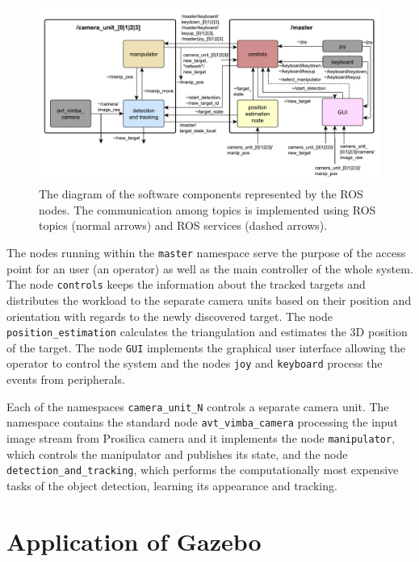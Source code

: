 	\begin{figure}[htb]
		\centering
		\includegraphics[width=14.5cm]{fig/sw_ols.pdf}
		\caption{The diagram of the software components represented by the ROS nodes. The communication among topics is implemented using ROS topics (normal arrows) and ROS services (dashed arrows).}
		\label{fig:sw_ols}
	\end{figure}
	
	The nodes running within the \texttt{master} namespace serve the purpose of the access point for an user (an operator) as well as the main controller of the whole system. The node \texttt{controls} keeps the information about the tracked targets and distributes the workload to the separate camera units based on their position and orientation with regards to the newly discovered target. The node \texttt{position\_estimation} calculates the triangulation and estimates the 3D position of the target. The node \texttt{GUI} implements the graphical user interface allowing the operator to control the system and the nodes \texttt{joy} and \texttt{keyboard} process the events from peripherals.
	
	Each of the namespaces \texttt{camera\_unit\_N} controls a separate camera unit. The namespace contains the standard node \texttt{avt\_vimba\_camera} processing the input image stream from Prosilica camera and it implements the node \texttt{manipulator}, which controls the manipulator and publishes its state, and the node \texttt{detection\_and\_tracking}, which performs the computationally most expensive tasks of the object detection, learning its appearance and tracking.
	
	
	\section{Application of Gazebo} \label{txt:application_of_gazebo}
	
